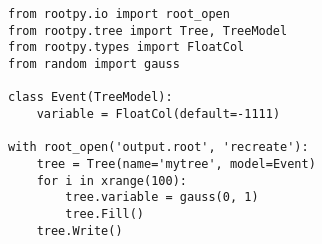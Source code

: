 \begin{footnotesize}
\begin{verbatim}
from rootpy.io import root_open
from rootpy.tree import Tree, TreeModel
from rootpy.types import FloatCol
from random import gauss

class Event(TreeModel):
    variable = FloatCol(default=-1111)

with root_open('output.root', 'recreate'):
    tree = Tree(name='mytree', model=Event)
    for i in xrange(100):
        tree.variable = gauss(0, 1)
        tree.Fill()
    tree.Write()
\end{verbatim}
\end{footnotesize}

